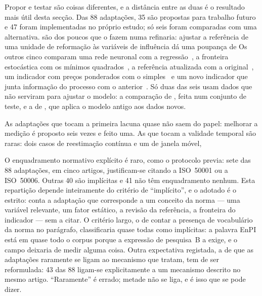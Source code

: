 Propor e testar são coisas diferentes, e a distância entre as duas é o
resultado mais útil desta secção. Das 88 adaptações, 35 são propostas para
trabalho futuro e 47 foram implementadas no próprio estudo; só seis foram
comparadas com uma alternativa. \textcite{Velazquez2013} são dos poucos que
o fazem numa refinaria: ajustar a referência de uma unidade de reformação às
variáveis de influência dá uma poupança de  Os outros cinco comparam uma
rede neuronal com a regressão~\cite{Hamedi2019}, a fronteira estocástica com
os mínimos quadrados~\cite{Boyd2017}, a referência atualizada com a
original~\cite{Boyd2013}, um indicador com preços ponderados com o
simples~\cite{Scripcariu2021} e um novo indicador que junta informação do
processo com o anterior~\cite{Khalid2024b}. Só duas das seis usam dados que
não serviram para ajustar o modelo: a comparação de \textcite{Hamedi2019},
feita num conjunto de teste, e a de \textcite{Boyd2013}, que aplica o modelo
antigo aos dados novos.

As adaptações que tocam a primeira lacuna quase não saem do papel: melhorar
a medição é proposto seis vezes e feito uma. As que tocam a validade
temporal são raras: dois casos de reestimação contínua e um de janela
móvel, 

O enquadramento normativo explícito é raro, como o protocolo previa: sete
das 88 adaptações, em cinco artigos, justificam-se citando a ISO~50001 ou a
ISO~50006. Outras 40 são implícitas e 41 não têm enquadramento nenhum. Esta
repartição depende inteiramente do critério de ``implícito'', e o adotado é o
estrito: conta a adaptação que corresponde a um conceito da norma --- uma
variável relevante, um fator estático, a revisão da referência, a fronteira
do indicador --- sem a citar. O critério largo, o de contar a presença de
vocabulário da norma no parágrafo, classificaria quase todas como implícitas:
a palavra EnPI está em quase todo o corpus porque a expressão de pesquisa~B a
exige, e o campo deixaria de medir alguma coisa. Outra expectativa registada, a de que as adaptações raramente se
ligam ao mecanismo que tratam, tem de ser reformulada: 43 das 88 ligam-se
explicitamente a um mecanismo descrito no mesmo artigo. ``Raramente'' é
errado; metade não se liga, e é isso que se pode dizer.

